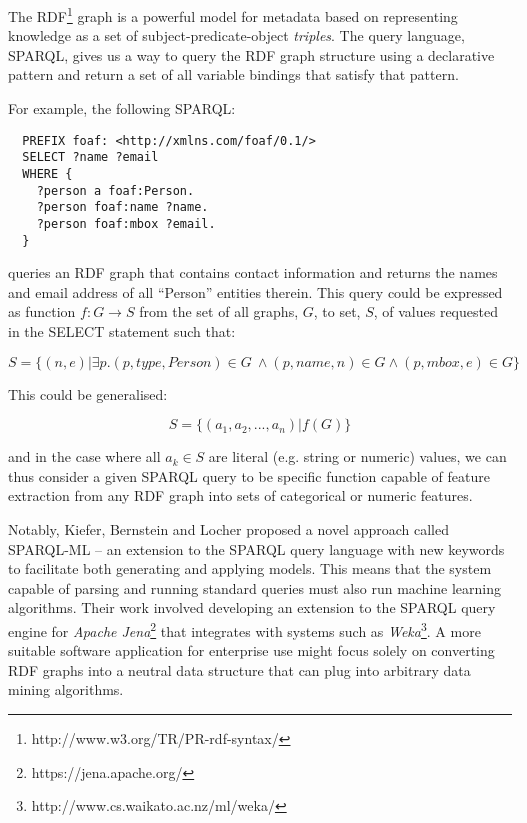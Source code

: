\documentclass[10pt,a4paper]{report}
\begin{document}
The RDF\footnote{http://www.w3.org/TR/PR-rdf-syntax/} graph is a powerful model
for metadata based on representing knowledge as a set of subject-predicate-object
\emph{triples}. The query language, SPARQL, gives us a way to query the RDF
graph structure using a declarative pattern and return a set of all variable
bindings that satisfy that pattern.

For example, the following SPARQL:

\begin{lstlisting}
  PREFIX foaf: <http://xmlns.com/foaf/0.1/>
  SELECT ?name ?email
  WHERE {
    ?person a foaf:Person.
    ?person foaf:name ?name.
    ?person foaf:mbox ?email.
  }
\end{lstlisting}

\noindent queries an RDF graph that contains contact information and returns the
names and email address of all ``Person'' entities therein. This query could be
expressed as function $f: G \rightarrow S$ from the set of all graphs, $G$, to
set, $S$, of values requested in the SELECT statement such that:

\begin{displaymath}
  S = \{(n, e) | \exists p . (p, type, Person) \in G\ \land (p, name, n) \in G \land (p, mbox, e) \in G\}
\end{displaymath}

This could be generalised:

\begin{displaymath}
  S = \{(a_1, a_2, ..., a_n) | f(G) \}
\end{displaymath}

\noindent and in the case where all $a_k \in S$ are literal (e.g. string or
numeric) values, we can thus consider a given SPARQL query to be specific function
capable of feature extraction from any RDF graph into sets of categorical or
numeric features.

Notably, Kiefer, Bernstein and Locher\cite{kiefer2008adding} proposed a novel
approach called SPARQL-ML -- an extension to the
SPARQL\cite{segaran2009programming} query language with new keywords to
facilitate both generating and applying models. This means that the system capable
of parsing and running standard queries must also run machine learning
algorithms. Their work involved developing an extension to the SPARQL query
engine for \emph{Apache Jena}\footnote{https://jena.apache.org/} that integrates
with systems such as \emph{Weka}\footnote{http://www.cs.waikato.ac.nz/ml/weka/}.
A more suitable software application for enterprise use might focus solely on
converting RDF graphs into a neutral data structure that can plug into arbitrary
data mining algorithms.
\end{document}
